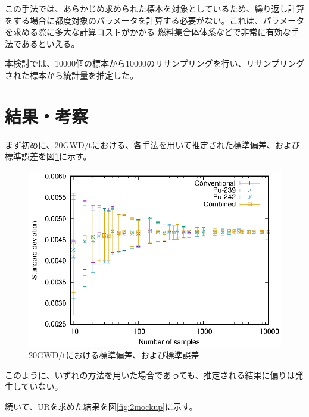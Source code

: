\documentclass[a4paper,11pt,titlepage,uplatex]{jsreport}
\begin{document}
この手法では、あらかじめ求められた標本を対象としているため、繰り返し計算をする場合に都度対象のパラメータを計算する必要がない。これは、パラメータを求める際に多大な計算コストがかかる
燃料集合体体系などで非常に有効な手法であるといえる。

本検討では、10000個の標本から10000のリサンプリングを行い、リサンプリングされた標本から統計量を推定した。

\section{結果・考察}
まず初めに、20$\mathrm{GWD/t}$における、各手法を用いて推定された標準偏差、および標準誤差を図\ref{fig:20g}に示す。
\begin{figure}[H]
  \centering
  \includegraphics{std.eps}
  \caption{20$\mathrm{GWD/t}$における標準偏差、および標準誤差}
  \label{fig:20g}
\end{figure}
このように、いずれの方法を用いた場合であっても、推定される結果に偏りは発生していない。

続いて、URを求めた結果を図\ref{fig:2mockup}に示す。
\end{document}
